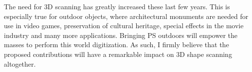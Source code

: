 \documentclass{report}
\begin{document}
The need for 3D scanning has greatly increased these last few years. This is especially true for outdoor objects, where architectural monuments are needed for use in video games, preservation of cultural heritage, special effects in the movie industry and many more applications. Bringing PS outdoors will empower the masses to perform this world digitization. As such, I firmly believe that the proposed contributions will have a remarkable impact on 3D shape scanning altogether.





%

{\small


}
\end{document}

